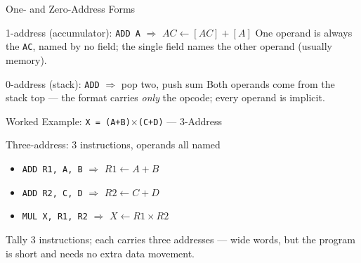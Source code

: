\documentclass[aspectratio=169]{beamer}
\begin{document}
\begin{frame}{One- and Zero-Address Forms}
  \begin{block}{1-address (accumulator): \texttt{ADD A} $\Rightarrow$ $AC \gets [AC]+[A]$}
    One operand is always the  \texttt{AC}, named by no field;
    the single field names the other operand (usually memory).
  \end{block}
  \begin{block}{0-address (stack): \texttt{ADD} $\Rightarrow$ pop two, push sum}
    Both operands come from the stack top --- the format carries \emph{only} the
    opcode; every operand is implicit.
  \end{block}
  \vspace{0.2cm}
\end{frame}

\begin{frame}{Worked Example: \texttt{X = (A+B)$\times$(C+D)} --- 3-Address}
  \begin{block}{Three-address: 3 instructions, operands all named}
    \begin{itemize}
      \item \texttt{ADD R1, A, B} \quad $\Rightarrow$ $R1 \gets A + B$
      \item \texttt{ADD R2, C, D} \quad $\Rightarrow$ $R2 \gets C + D$
      \item \texttt{MUL X, R1, R2} \quad $\Rightarrow$ $X \gets R1 \times R2$
    \end{itemize}
  \end{block}
  \begin{exampleblock}{Tally}
    3 instructions; each carries three addresses --- wide words, but the program
    is short and needs no extra data movement.
  \end{exampleblock}
\end{frame}
\end{document}
